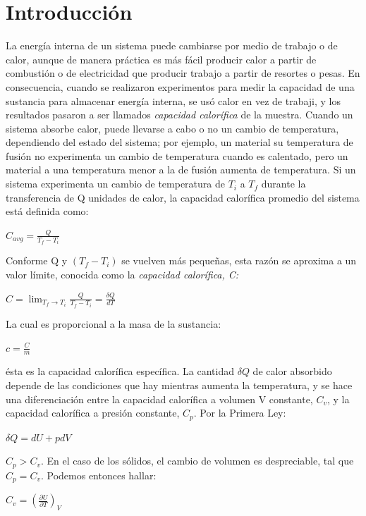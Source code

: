 \documentclass[12pt]{article}
\begin{document}
\section{Introducci\'on}
La energía interna de un sistema puede cambiarse por medio de trabajo o de calor, aunque de manera práctica es más fácil producir calor a partir de combustión o de electricidad que producir trabajo a partir de resortes o pesas. En consecuencia, cuando se realizaron experimentos para medir la capacidad de una sustancia para almacenar energía interna, se usó calor en vez de trabaji, y los resultados pasaron a ser llamados \emph{capacidad calorífica} de la muestra. 
Cuando un sistema absorbe calor, puede llevarse a cabo o no un cambio de temperatura, dependiendo del estado del sistema; por ejemplo, un material  su temperatura de fusión no experimenta un cambio de temperatura cuando es calentado, pero un material a una temperatura menor a la de fusión aumenta de temperatura. Si un sistema experimenta un cambio de temperatura de $T_{i}$ a $T_{f}$ durante la transferencia de Q unidades de calor, la capacidad calorífica promedio del sistema está definida como:
\begin{center}
\large{$C_{avg} = \frac{Q}{T_{f}-T_{i}}$}
\end{center}
Conforme Q y $(T_{f}-T_{i})$ se vuelven más pequeñas, esta razón se aproxima a un valor límite, conocida como la \emph{capacidad calorífica, C:}
\begin{center}
\large{$C=\lim_{T_{f}\rightarrow T_{i}} \frac{Q}{T_{f}-T_{i}}=\frac{\delta Q}{dT}$}
\end{center}
La cual es proporcional a la masa de la sustancia:
\begin{center}
\large{$c=\frac{C}{m}$}
\end{center}
ésta es la capacidad calorífica específica.\cite{ce:1}
 La cantidad $\delta Q$ de calor absorbido depende de las condiciones que hay mientras aumenta la temperatura, y se hace una diferenciación entre la capacidad calorífica a volumen V constante, $C_{v}$, y la capacidad calorífica a presión constante, $C_{p}$.
Por la Primera Ley:
\begin{center}
\large{$\delta Q= dU + pdV$}
\end{center}
$C_{p}>C_{v}$. En el caso de los sólidos, el cambio de volumen es despreciable, tal que $C_{p}=C_{v}$. Podemos entonces hallar: 
\begin{center}
\large{$C_{v}=\left(\frac{\partial U}{\partial T}\right)_{V}$}
\end{center}
\end{document}
